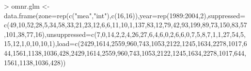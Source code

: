 \begin{Schunk}
\begin{Sinput}
> omnr.glm <- data.frame(zone=rep(c("mea","int"),c(16,16)),year=rep(1989:2004,2),suppressed=c(49,10,52,28,5,34,58,33,21,23,12,6,6,11,10,1,137,83,12,79,42,93,199,89,73,150,83,57,101,38,77,16),unsuppressed=c(7,0,14,2,2,4,26,27,6,4,6,0,2,6,6,0,7,5,8,7,1,1,27,54,5,15,12,1,0,10,10,1),load=c(2429,1614,2559,960,743,1053,2122,1245,1634,2278,1017,644,1561,1138,1036,428,2429,1614,2559,960,743,1053,2122,1245,1634,2278,1017,644,1561,1138,1036,428))
\end{Sinput}
\end{Schunk}
